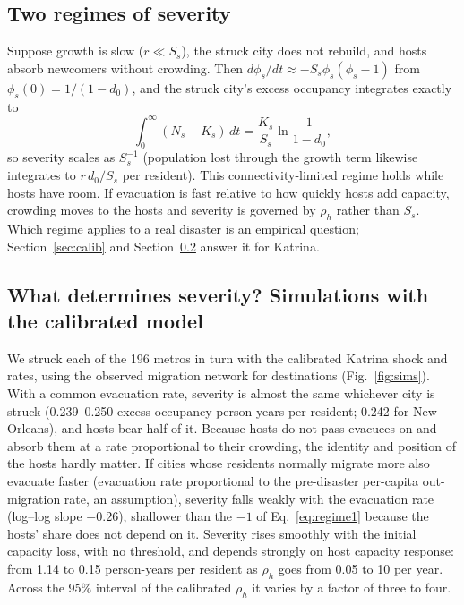 \documentclass[11pt]{article}
\begin{document}
\subsection{Two regimes of severity}\label{sec:theory}

Suppose growth is slow ($r\ll S_s$), the struck city does not rebuild, and hosts absorb newcomers without crowding. Then $d\phi_s/dt\approx-S_s\phi_s(\phi_s-1)$ from $\phi_s(0)=1/(1-d_0)$, and the struck city's excess occupancy integrates exactly to
\begin{equation}
\int_0^\infty (N_s-K_s)\,dt = \frac{K_s}{S_s}\ln\frac{1}{1-d_0},
\label{eq:regime1}
\end{equation}
so severity scales as $S_s^{-1}$ (population lost through the growth term likewise integrates to $r\,d_0/S_s$ per resident). This connectivity-limited regime holds while hosts have room. If evacuation is fast relative to how quickly hosts add capacity, crowding moves to the hosts and severity is governed by $\rho_h$ rather than $S_s$. Which regime applies to a real disaster is an empirical question; Section~\ref{sec:calib} and Section~\ref{sec:sims} answer it for Katrina.

\subsection{What determines severity? Simulations with the calibrated model}\label{sec:sims}

We struck each of the 196 metros in turn with the calibrated Katrina shock and rates, using the observed migration network for destinations (Fig.~\ref{fig:sims}). With a common evacuation rate, severity is almost the same whichever city is struck (0.239--0.250 excess-occupancy person-years per resident; 0.242 for New Orleans), and hosts bear half of it. Because hosts do not pass evacuees on and absorb them at a rate proportional to their crowding, the identity and position of the hosts hardly matter. If cities whose residents normally migrate more also evacuate faster (evacuation rate proportional to the pre-disaster per-capita out-migration rate, an assumption), severity falls weakly with the evacuation rate (log--log slope $-0.26$), shallower than the $-1$ of Eq.~\eqref{eq:regime1} because the hosts' share does not depend on it. Severity rises smoothly with the initial capacity loss, with no threshold, and depends strongly on host capacity response: from 1.14 to 0.15 person-years per resident as $\rho_h$ goes from 0.05 to 10 per year. Across the 95\% interval of the calibrated $\rho_h$ it varies by a factor of three to four.
\end{document}
